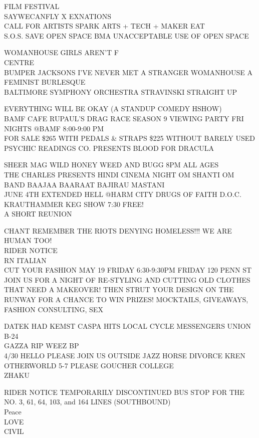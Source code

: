 \documentclass[10pt,letterpaper]{article}
\begin{document}
FILM FESTIVAL\\
SAYWECANFLY X EXNATIONS\\
CALL FOR ARTISTS SPARK ARTS + TECH + MAKER EAT\\
S.O.S. SAVE OPEN SPACE BMA UNACCEPTABLE USE OF OPEN SPACE

WOMANHOUSE GIRLS AREN'T F\\
CENTRE\\
BUMPER JACKSONS I'VE NEVER MET A STRANGER WOMANHOUSE A FEMINIST BURLESQUE\\
BALTIMORE SYMPHONY ORCHESTRA STRAVINSKI STRAIGHT UP

EVERYTHING WILL BE OKAY (A STANDUP COMEDY HSHOW)\\
BAMF CAFE RUPAUL'S DRAG RACE SEASON 9 VIEWING PARTY FRI NIGHTS @BAMF 8:00{-}9:00 PM\\
FOR SALE \$265 WITH PEDALS \& STRAPS \$225 WITHOUT BARELY USED\\
PSYCHIC READINGS CO. PRESENTS BLOOD FOR DRACULA

SHEER MAG WILD HONEY WEED AND BUGG 8PM ALL AGES\\
THE CHARLES PRESENTS HINDI CINEMA NIGHT OM SHANTI OM BAND BAAJAA BAARAAT BAJIRAU MASTANI\\
JUNE 4TH EXTENDED HELL @HARM CITY DRUGS OF FAITH D.O.C. KRAUTHAMMER KEG SHOW 7:30 FREE!\\
A SHORT REUNION

CHANT REMEMBER THE RIOTS DENYING HOMELESS!!! WE ARE HUMAN TOO!\\
RIDER NOTICE\\
RN ITALIAN\\
CUT YOUR FASHION MAY 19 FRIDAY 6:30{-}9:30PM FRIDAY 120 PENN ST JOIN US FOR A NIGHT OF RE{-}STYLING AND CUTTING OLD CLOTHES THAT NEED A MAKEOVER!  THEN STRUT YOUR DESIGN ON THE RUNWAY FOR A CHANCE TO WIN PRIZES!  MOCKTAILS, GIVEAWAYS, FASHION CONSULTING, SEX

DATEK HAD KEMST CASPA HITS LOCAL CYCLE MESSENGERS UNION B{-}24\\
GAZZA RIP WEEZ BP\\
4/30 HELLO PLEASE JOIN US OUTSIDE JAZZ HORSE DIVORCE KREN OTHERWORLD 5{-}7 PLEASE GOUCHER COLLEGE\\
ZHAKU

RIDER NOTICE TEMPORARILY DISCONTINUED BUS STOP FOR THE NO. 3, 61, 64, 103, and 164 LINES (SOUTHBOUND)\\
Peace\\
LOVE\\
CIVIL
\end{document}
